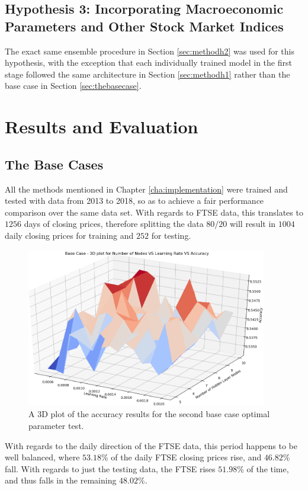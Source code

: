 \documentclass{UoYCSproject}
\begin{document}
\section{Hypothesis 3: Incorporating Macroeconomic Parameters and Other Stock Market Indices}
\label{sec:methodh3}
The exact same ensemble procedure in Section \ref{sec:methodh2} was used for this hypothesis, with the exception that each individually trained model in the first stage followed the same architecture in Section \ref{sec:methodh1} rather than the base case in Section \ref{sec:thebasecase}. 


\chapter{Results and Evaluation}
\label{cha:resultsandevaluation}
\section{The Base Cases}
All the methods mentioned in Chapter \ref{cha:implementation} were trained and tested with data from 2013 to 2018, so as to achieve a fair performance comparison over the same data set. With regards to FTSE data, this translates to $1256$ days of closing prices, therefore splitting the data $80/20$ will result in $1004$ daily closing prices for training and $252$ for testing.

\begin{figure}[h]
\includegraphics[width=10.5cm]{base_accuracy.png}
\centering
\caption{A 3D plot of the accuracy results for the second base case optimal parameter test.} 
\label{fig:base_plot_accuracy}
\end{figure}

With regards to the daily direction of the FTSE data, this period happens to be well balanced, where $53.18$\% of the daily FTSE closing prices rise, and $46.82$\% fall. With regards to just the testing data, the FTSE rises $51.98$\% of the time, and thus falls in the remaining $48.02$\%.
\end{document}
